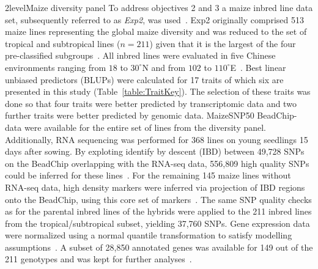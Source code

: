 \documentclass[12pt,titlepage]{article}
\begin{document}
\Genetics2level{Maize diversity panel}
To address objectives 2 and 3 a maize inbred line data set, subsequently
referred to as \textit{Exp2}, was used~\cite{Yang2014}.
Exp2 originally comprised 513 maize lines representing the global maize
diversity  and was reduced to the set of tropical and subtropical lines
($n = 211$) given that it is the largest of the four pre-classified
subgroups~\cite{Yang2014}.
All inbred lines were evaluated in five Chinese environments ranging from
$18$ to $30^{\circ}$N and from $102$ to $110^{\circ}$E~\cite{Yang2014}.
Best linear unbiased predictors (BLUPs) were calculated for 17 traits of which 
six are presented in this study (Table~\ref{table:TraitKey}).
The selection of these traits was done so that four traits were better 
predicted by transcriptomic data and two further traits were better predicted 
by genomic data.
MaizeSNP50 BeadChip-data were available for the entire set of lines from the
diversity panel.
Additionally, RNA sequencing was performed for 368 lines on young seedlings 15 
days after sowing.
By exploting identify by descent (IBD) between 49,728 SNPs on the BeadChip 
overlapping with the RNA-seq data, 556,809 high quality SNPs could be inferred 
for these lines~\cite{Fu2013,Li2013}.
For the remaining 145 maize lines without RNA-seq data, high density markers
were inferred via projection of IBD regions onto the BeadChip, using this core 
set of markers~\cite{Yang2014}.
The same SNP quality checks as for the parental inbred lines of the hybrids
were applied to the 211 inbred lines from the tropical/subtropical subset,
yielding 37,760 SNPs.
Gene expression data were normalized using a normal quantile transformation to
satisfy modelling assumptions~\cite{Fu2013}.
A subset of 28,850 annotated genes was available for 149 out of the 211
genotypes and was kept for further analyses~\cite{Li2013}.
\end{document}
